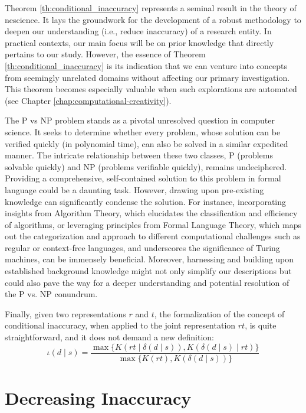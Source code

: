 Theorem \ref{th:conditional_inaccuracy} represents a seminal result in the theory of nescience. It lays the groundwork for the development of a robust methodology to deepen our understanding (i.e., reduce inaccuracy) of a research entity. In practical contexts, our main focus will be on prior knowledge that directly pertains to our study. However, the essence of Theorem \ref{th:conditional_inaccuracy} is its indication that we can venture into concepts from seemingly unrelated domains without affecting our primary investigation. This theorem becomes especially valuable when such explorations are automated (see Chapter \ref{chap:computational-creativity}).

\begin{example}
The P vs NP problem stands as a pivotal unresolved question in computer science. It seeks to determine whether every problem, whose solution can be verified quickly (in polynomial time), can also be solved in a similar expedited manner. The intricate relationship between these two classes, P (problems solvable quickly) and NP (problems verifiable quickly), remains undeciphered. Providing a comprehensive, self-contained solution to this problem in formal language could be a daunting task. However, drawing upon pre-existing knowledge can significantly condense the solution. For instance, incorporating insights from Algorithm Theory, which elucidates the classification and efficiency of algorithms, or leveraging principles from Formal Language Theory, which maps out the categorization and approach to different computational challenges such as regular or context-free languages, and underscores the significance of Turing machines, can be immensely beneficial. Moreover, harnessing and building upon established background knowledge might not only simplify our descriptions but could also pave the way for a deeper understanding and potential resolution of the P vs. NP conundrum.
\end{example}

Finally, given two representations $r$ and $t$, the formalization of the concept of conditional inaccuracy, when applied to the joint representation $rt$, is quite straightforward, and it does not demand a new definition:
\[
\iota(d \mid s) = \frac{ \max\{ K \left(rt \mid \delta(d \mid s) \right), K \left( \delta(d \mid s) \mid rt \right) \} } { \max\{ K(rt), K \left(\delta(d \mid s) \right) \} }
\]


%
%

\section{Decreasing Inaccuracy}

